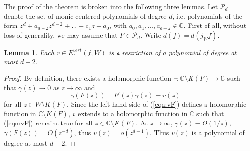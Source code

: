 \documentclass{amsart}
\numberwithin{equation}{section}
\newtheorem{lemma}[theorem]{Lemma}%
\newcommand{\C}{\mathbb C}
\theoremstyle{definition}
\theoremstyle{remark}
\begin{document}

The proof of the theorem is broken into the following three lemmas. Let $\mathcal{P}_d$ denote the set of monic centered polynomials of degree $d$, i.e. polynomials of the form 
$z^d+a_{d-2}z^{d-2}+\dots+a_1z+a_0$, with $a_0,a_1,\dots, a_{d-2}\in \C$.  
First of all, without loss of generality, we may assume that $F\in \mathcal{P}_d$.
Write $d(f)=d(j_Wf)$.
\begin{lemma}\label{lem:Fvertup} Each $v\in E^{vert}_*(f,W)$ is a restriction of a polynomial of degree at most $d-2$.  
\end{lemma}
\begin{proof}
By definition, there exists a holomorphic function $\gamma:\mathbb{C}\setminus K(F)\to \mathbb{C}$ such that $\gamma(z)\to 0$ as $z\to \infty$ and 
\begin{equation}\label{eqn:vF}
\gamma(F(z))-F'(z)\gamma(z)=v(z)
\end{equation}
for all $z\in W\setminus K(F)$. Since the left hand side of (\ref{eqn:vF}) defines a holomorphic function in $\C\setminus K(F)$, $v$ extends to a holomorphic function in $\C$ such that (\ref{eqn:vF}) remains true for all $z\in  \C\setminus K(F)$. As $z\to\infty$, $\gamma(z)=O(1/z)$, $\gamma(F(z))=O(z^{-d})$, thus $v(z)=o(z^{d-1})$. Thus $v(z)$ is a polynomial of degree at most $d-2$. 
\end{proof}
\end{document}
